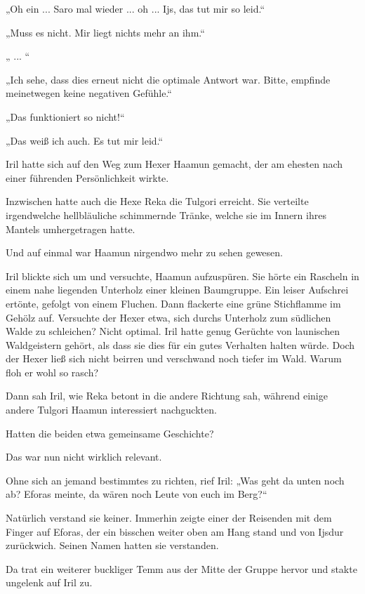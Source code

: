 „Oh ein ... Saro mal wieder ... oh ... Ijs, das tut mir so leid.“

„Muss es nicht. Mir liegt nichts mehr an ihm.“

„ ... “

„Ich sehe, dass dies erneut nicht die optimale Antwort war. Bitte, empfinde meinetwegen keine negativen Gefühle.“

„Das funktioniert so nicht!“

„Das weiß ich auch. Es tut mir leid.“\bigskip







Iril hatte sich auf den Weg zum Hexer Haamun gemacht, der am ehesten nach einer führenden Persönlichkeit wirkte.

Inzwischen hatte auch die Hexe Reka die Tulgori erreicht. Sie verteilte irgendwelche hellbläuliche schimmernde Tränke, welche sie im Innern ihres Mantels umhergetragen hatte.

Und auf einmal war Haamun nirgendwo mehr zu sehen gewesen.

Iril blickte sich um und versuchte, Haamun aufzuspüren. Sie hörte ein Rascheln in einem nahe liegenden Unterholz einer kleinen Baumgruppe. Ein leiser Aufschrei ertönte, gefolgt von einem Fluchen. Dann flackerte eine grüne Stichflamme im Gehölz auf. Versuchte der Hexer etwa, sich durchs Unterholz zum südlichen Walde zu schleichen? Nicht optimal. Iril hatte genug Gerüchte von launischen Waldgeistern gehört, als dass sie dies für ein gutes Verhalten halten würde. Doch der Hexer ließ sich nicht beirren und verschwand noch tiefer im Wald. Warum floh er wohl so rasch?

Dann sah Iril, wie Reka betont in die andere Richtung sah, während einige andere Tulgori Haamun interessiert nachguckten.

Hatten die beiden etwa gemeinsame Geschichte?

Das war nun nicht wirklich relevant.

Ohne sich an jemand bestimmtes zu richten, rief Iril: „Was geht da unten noch ab? Eforas meinte, da wären noch Leute von euch im Berg?“

Natürlich verstand sie keiner. Immerhin zeigte einer der Reisenden mit dem Finger auf Eforas, der ein bisschen weiter oben am Hang stand und von Ijsdur zurückwich. Seinen Namen hatten sie verstanden.

Da trat ein weiterer buckliger Temm aus der Mitte der Gruppe hervor und stakte ungelenk auf Iril zu.

